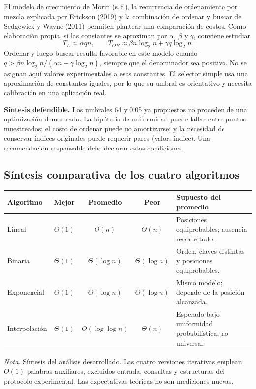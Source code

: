 El modelo de crecimiento de Morin (s.\,f.), la recurrencia de ordenamiento por mezcla explicada por Erickson (2019) y la combinación de ordenar y buscar de Sedgewick y Wayne (2011) permiten plantear una comparación de costos. Como elaboración propia, si las constantes se aproximan por $\alpha$, $\beta$ y $\gamma$, conviene estudiar
\[
T_L\approx\alpha qn,\qquad T_{OB}\approx\beta n\log_2n+\gamma q\log_2n.
\]
Ordenar y luego buscar resulta favorable en este modelo cuando $q>\beta n\log_2n/(\alpha n-\gamma\log_2n)$, siempre que el denominador sea positivo. No se asignan aquí valores experimentales a esas constantes. El selector simple usa una aproximación de constantes iguales, por lo que su umbral es orientativo y necesita calibración en una aplicación real.

\textbf{Síntesis defendible.} Los umbrales 64 y 0.05 ya propuestos no proceden de una optimización demostrada. La hipótesis de uniformidad puede fallar entre puntos muestreados; el costo de ordenar puede no amortizarse; y la necesidad de conservar índices originales puede requerir pares (valor, índice). Una recomendación responsable debe declarar estas condiciones.

\subsection*{Síntesis comparativa de los cuatro algoritmos}
\begin{center}\small
\begin{tabularx}{\textwidth}{@{}lcccX@{}}\toprule
Algoritmo & Mejor & Promedio & Peor & Supuesto del promedio\\\midrule
Lineal & $\Theta(1)$ & $\Theta(n)$ & $\Theta(n)$ & Posiciones equiprobables; ausencia recorre todo.\\
Binaria & $\Theta(1)$ & $\Theta(\log n)$ & $\Theta(\log n)$ & Orden, claves distintas y posiciones equiprobables.\\
Exponencial & $\Theta(1)$ & $\Theta(\log n)$ & $\Theta(\log n)$ & Mismo modelo; depende de la posición alcanzada.\\
Interpolación & $\Theta(1)$ & $O(\log\log n)$ & $\Theta(n)$ & Esperado bajo uniformidad probabilística; no universal.\\\bottomrule
\end{tabularx}
\end{center}
\textit{Nota.} Síntesis del análisis desarrollado. Las cuatro versiones iterativas emplean $O(1)$ palabras auxiliares, excluidos entrada, consultas y estructuras del protocolo experimental. Las expectativas teóricas no son mediciones nuevas.
